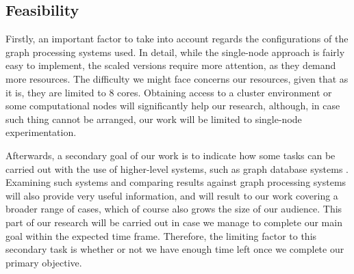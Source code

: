 \documentclass[a4paper,11pt]{article}
\begin{document}
\subsection{Feasibility} \label{feasibility}

\par Firstly, an important factor to take into account regards the configurations of the graph processing systems used. In detail, while the single-node approach is fairly easy to implement, the scaled versions require more attention, as they demand more resources. The difficulty we might face concerns our resources, given that as it is, they are limited to 8 cores. Obtaining access to a cluster environment or some computational nodes will significantly help our research, although, in case such thing cannot be arranged, our work will be limited to single-node experimentation.

\par Afterwards, a secondary goal of our work is to indicate how some tasks can be carried out with the use of higher-level systems, such as graph database systems \cite{emptyheaded, emptyheadedgit, neo4j}.  Examining such systems and comparing results against graph processing systems will also provide very useful information, and will result to our work covering a broader range of cases, which of course also grows the size of our audience. This part of our research will be carried out in case we manage to complete our main goal within the expected time frame. Therefore, the limiting factor to this secondary task is whether or not we have enough time left once we complete our primary objective.



\end{document}
